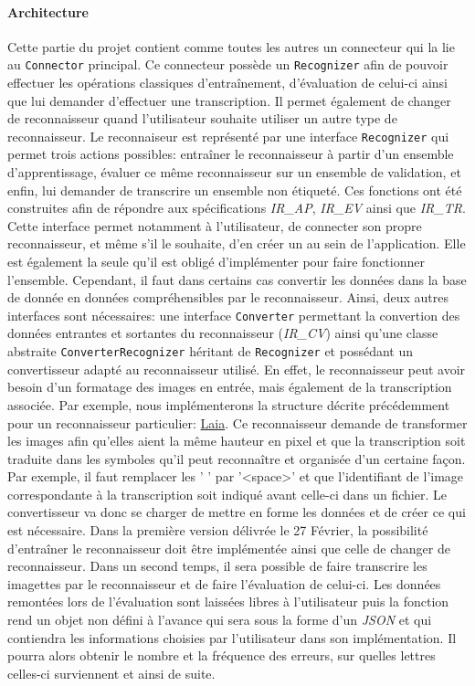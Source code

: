 \paragraph{Architecture}

Cette partie du projet contient comme toutes les autres un connecteur qui la lie au \texttt{Connector} principal. Ce connecteur possède un \texttt{Recognizer} afin de pouvoir effectuer les opérations classiques d'entraînement, d'évaluation de celui-ci ainsi que lui demander d'effectuer une transcription. Il permet également de changer de reconnaisseur quand l'utilisateur souhaite utiliser un autre type de reconnaisseur.
\newline{}
Le reconnaiseur est représenté par une interface \texttt{Recognizer} qui permet trois actions possibles: entraîner le reconnaisseur à partir d'un ensemble d'apprentissage, évaluer ce même reconnaisseur sur un ensemble de validation, et enfin, lui demander de transcrire un ensemble non étiqueté. Ces fonctions ont été construites afin de répondre aux spécifications \textit{IR\_AP}, \textit{IR\_EV} ainsi que \textit{IR\_TR}.
Cette interface permet notamment à l'utilisateur, de connecter son propre reconnaisseur, et même s'il le souhaite, d'en créer un au sein de l'application. Elle est également la seule qu'il est obligé d'implémenter pour faire fonctionner l'ensemble. Cependant, il faut dans certains cas convertir les données dans la base de donnée en données compréhensibles par le reconnaisseur. Ainsi, deux autres interfaces sont nécessaires: une interface \texttt{Converter} permettant la convertion des données entrantes et sortantes du reconnaisseur (\textit{IR\_CV}) ainsi qu'une classe abstraite \texttt{ConverterRecognizer} héritant de \texttt{Recognizer} et possédant un convertisseur adapté au reconnaisseur utilisé. En effet, le reconnaisseur peut avoir besoin d'un formatage des images en entrée, mais également de la transcription associée. Par exemple, nous implémenterons la structure décrite précédemment pour un reconnaisseur particulier: \href{https://github.com/jpuigcerver/Laia}{Laia}. Ce reconnaisseur demande de transformer les images afin qu'elles aient la même hauteur en pixel et que la transcription soit traduite dans les symboles qu'il peut reconnaître et organisée d'un certaine façon. Par exemple, il faut remplacer les  ' ' par '<space>' et que l'identifiant de l'image correspondante à la transcription soit indiqué avant celle-ci dans un fichier. Le convertisseur va donc se charger de mettre en forme les données et de créer ce qui est nécessaire.
\newline{}
Dans la première version délivrée le 27 Février, la possibilité d'entraîner le reconnaisseur doit être implémentée ainsi que celle de changer de reconnaisseur. Dans un second temps, il sera possible de faire transcrire les imagettes par le reconnaisseur et de faire l'évaluation de celui-ci. Les données remontées lors de l'évaluation sont laissées libres à l'utilisateur puis la fonction rend un objet non défini à l'avance qui sera sous la forme d'un \textit{JSON} et qui contiendra les informations choisies par l'utilisateur dans son implémentation. Il pourra alors obtenir le nombre et la fréquence des erreurs, sur quelles lettres celles-ci surviennent et ainsi de suite.

